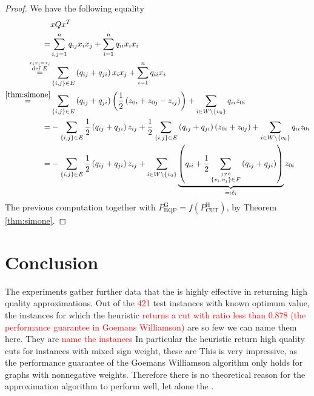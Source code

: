 \documentclass[12pt,a4paper]{article}
\theoremstyle{mythm}
\begin{document}
\begin{proof}
We have the following equality 
\begin{align*}
&x Q x ^T \\
=& \sum_{ i,j = 1 }^{ n } q _{ ij } x_i x_j + \sum_{ i = 1 }^{ n } q _{ ii } x_i x_{ i } \\
\overset{ \overset{ x_i x_i = x_i  }{ \text{def } E} }{ =}&  \sum_{ \left\{ i,j \right\} \in E  }^{  } \left( q _{ ij } + q _{ ji } \right) x_i x_j + \sum_{ i = 1 }^{ n } q
_{ ii } x_i \\
\overset{ \ref{thm:simone}  }{ =}& \sum_{ \left\{ i,j \right\} \in E  }^{  } \left( q _{ ij } + q _{ ji }  \right) \left( \frac{ 1 }{ 2 } \left( z _{ 0i } + z _{ 0j } - z _{
ij }  \right)  \right) + \sum_{ i \in W \setminus \left\{ v_0 \right\}   }^{  } q _{ ii } z _{ 0i } \\
=& -  \sum_{ \left\{ i,j \right\} \in E  }^{  } \frac{ 1 }{ 2 } \left( q _{ ij } + q _{ ji }  \right) z _{ ij } + 
\frac{ 1 }{ 2 } \sum_{  \left\{ i,j \right\}  \in E }^{ } \left( q _{ ij } +
q _{ ji }  \right) \left(  z _{ 0i } + z _{ 0j } \right) + \sum_{ i \in W \setminus \left\{ v_0 \right\}   }^{  } q _{ ii } z _{ 0i } \\
=& - \sum_{ \left\{ i,j \right\} \in E }^{  } \frac{ 1 }{ 2 } \left( q _{ ij } + q _{ ji }  \right) z _{ ij } + 
\sum_{ i \in W \setminus \left\{ v_0 \right\}   }^{  } \underbrace{ \left( q _{ ii } + \frac{ 1 }{ 2 } \sum_{ \overset{ j \neq 0  }{ \left\{ v_i , v_j \right\} \in F} }^{  }  \left( q _{
ij } + q _{ ji }  \right) \right) }_{ =: \tilde{ c } _i }  z _{ 0i } 
\end{align*} 
The previous computation together with $  P ^{ \text{G}  }  _{ \text{BQP}  } = f \left( P ^{ \text{H}  } _{ \text{CUT}  }  \right)    $, by Theorem \ref{thm:simone}.
\end{proof}

\section{ Conclusion  } 
The experiments gather further data that the \BH is highly effective in returning high quality approximations.
Out of the \textcolor{red}{421} test instances with known optimum value, the instances for which the heuristic \textcolor{red}{returns a cut with ratio less than 0.878 (the
performance guarantee in Goemans Williamson) } are so few we can name them here. They are
\textcolor{red}{name the instances}
In particular the heuristic return high quality cuts for instances with mixed sign weight, these are
This is very impressive, as the performance guarantee of the Goemans Williamson algorithm only holds for graphs with nonnegative weights. Therefore there is no theoretical
reason for the approximation algorithm to perform well, let alone the \BH.
\end{document}
